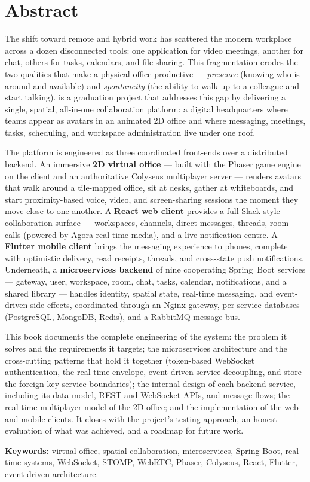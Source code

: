 \chapter*{Abstract}

The shift toward remote and hybrid work has scattered the modern workplace across
a dozen disconnected tools: one application for video meetings, another for
chat, others for tasks, calendars, and file sharing. This fragmentation erodes
the two qualities that make a physical office productive --- \emph{presence}
(knowing who is around and available) and \emph{spontaneity} (the ability to walk
up to a colleague and start talking). \voname{} is a graduation project that
addresses this gap by delivering a single, spatial, all-in-one collaboration
platform: a digital headquarters where teams appear as avatars in an animated
2D office and where messaging, meetings, tasks, scheduling, and workspace
administration live under one roof.

The platform is engineered as three coordinated front-ends over a
distributed backend. An immersive \textbf{2D virtual office} --- built with the
Phaser game engine on the client and an authoritative Colyseus multiplayer
server --- renders avatars that walk around a tile-mapped office, sit at desks,
gather at whiteboards, and start proximity-based voice, video, and screen-sharing
sessions the moment they move close to one another. A \textbf{React web client}
provides a full Slack-style collaboration surface --- workspaces, channels,
direct messages, threads, room calls (powered by Agora real-time media), and a
live notification centre. A \textbf{Flutter mobile client} brings the messaging
experience to phones, complete with optimistic delivery, read receipts, threads,
and cross-state push notifications. Underneath, a \textbf{microservices backend}
of nine cooperating Spring~Boot services --- gateway, user, workspace, room,
chat, tasks, calendar, notifications, and a shared library --- handles identity,
spatial state, real-time messaging, and event-driven side effects, coordinated
through an Nginx gateway, per-service databases (PostgreSQL, MongoDB, Redis),
and a RabbitMQ message bus.

This book documents the complete engineering of the system: the problem it
solves and the requirements it targets; the microservices architecture and the
cross-cutting patterns that hold it together (token-based WebSocket
authentication, the  real-time envelope, event-driven
service decoupling, and store-the-foreign-key service boundaries); the internal
design of each backend service, including its data model, REST and WebSocket
APIs, and message flows; the real-time multiplayer model of the 2D office; and
the implementation of the web and mobile clients. It closes with the project's
testing approach, an honest evaluation of what was achieved, and a roadmap for
future work.

\vspace{0.8cm}
\noindent\textbf{Keywords:} virtual office, spatial collaboration, microservices,
Spring Boot, real-time systems, WebSocket, STOMP, WebRTC, Phaser, Colyseus,
React, Flutter, event-driven architecture.
